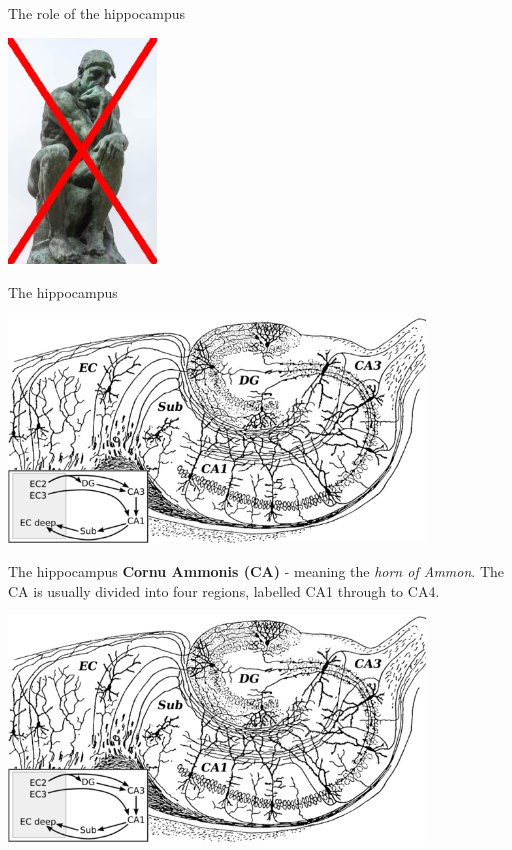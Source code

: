 \documentclass{beamer}
\begin{document}
\begin{frame}{The role of the hippocampus}
  \begin{center}
    \includegraphics[height=6cm]{the_thinker_cancelled.jpg}
  \end{center}
      \vfill
\end{frame}

  
\begin{frame}{The hippocampus}
  \begin{center}
    \includegraphics[height=6cm]{hippocampus.png}
  \end{center}
      \vfill
\end{frame}



\begin{frame}{The hippocampus}
\color{red}\textbf{Cornu Ammonis (CA)} - meaning the \textsl{horn of Ammon}. The CA is usually divided
  into four regions, labelled CA1 through to CA4.\color{black}
  \begin{center}
    \includegraphics[height=6cm]{hippocampus.png}
  \end{center}
      \vfill
\end{frame}
\end{document}
